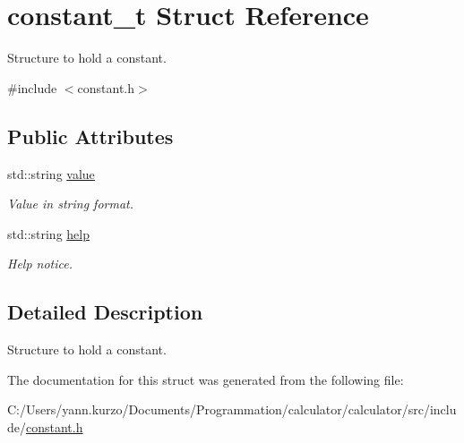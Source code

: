\hypertarget{structconstant__t}{}\section{constant\+\_\+t Struct Reference}
\label{structconstant__t}


Structure to hold a constant.  




{\ttfamily \#include $<$constant.\+h$>$}

\subsection*{Public Attributes}
\begin{DoxyCompactItemize}
\item 
\hypertarget{structconstant__t_aee34d4fa51a09c05522fbf11f4c33fa2}{}std\+::string \hyperlink{structconstant__t_aee34d4fa51a09c05522fbf11f4c33fa2}{value}\label{structconstant__t_aee34d4fa51a09c05522fbf11f4c33fa2}

\begin{DoxyCompactList}\small\item\em Value in string format. \end{DoxyCompactList}\item 
\hypertarget{structconstant__t_abfb53a8bb4b5803ac1f10cd7f0a571dd}{}std\+::string \hyperlink{structconstant__t_abfb53a8bb4b5803ac1f10cd7f0a571dd}{help}\label{structconstant__t_abfb53a8bb4b5803ac1f10cd7f0a571dd}

\begin{DoxyCompactList}\small\item\em Help notice. \end{DoxyCompactList}\end{DoxyCompactItemize}


\subsection{Detailed Description}
Structure to hold a constant. 

The documentation for this struct was generated from the following file\+:\begin{DoxyCompactItemize}
\item 
C\+:/\+Users/yann.\+kurzo/\+Documents/\+Programmation/calculator/calculator/src/include/\hyperlink{constant_8h}{constant.\+h}\end{DoxyCompactItemize}
